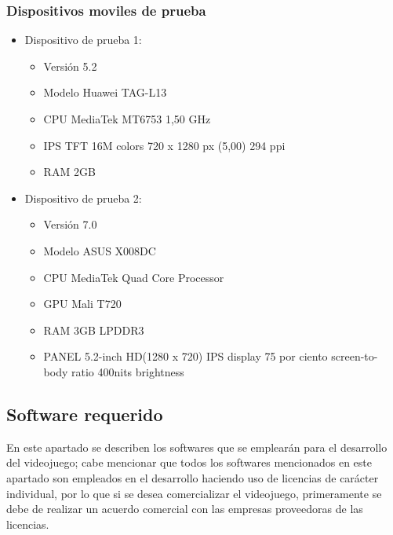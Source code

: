  	\subsubsection{Dispositivos moviles de prueba}
 		\begin{itemize}   		
			\item Dispositivo de prueba 1:
		   		\begin{itemize}
		   			\item Versión 5.2
		   			\item Modelo Huawei TAG-L13
		   			\item CPU MediaTek MT6753 1,50 GHz
		   			\item IPS TFT 16M colors 720 x 1280 px (5,00) 294 ppi
		   			\item RAM 2GB	   			
		   		\end{itemize}
   		
   			\item Dispositivo de prueba 2:
		   		\begin{itemize}
		   			\item Versión 7.0
		   			\item Modelo ASUS X008DC
		   			\item CPU MediaTek Quad Core Processor
		   			\item GPU Mali T720
		   			\item RAM 3GB LPDDR3
		   			\item PANEL 5.2-inch
		   			HD(1280 x 720) IPS display 
		   			75 por ciento screen-to-body ratio
		   			400nits brightness 
		   		\end{itemize}   		  		
   		\end{itemize}


\subsection{Software requerido}
En este apartado se describen los softwares que se emplearán para el desarrollo 
del videojuego; cabe mencionar que todos los softwares mencionados en este apartado 
son empleados en el desarrollo haciendo uso de licencias de carácter individual, 
por lo que si se desea comercializar el videojuego, primeramente se debe de realizar  
un acuerdo comercial con las empresas proveedoras de las licencias. 
 
